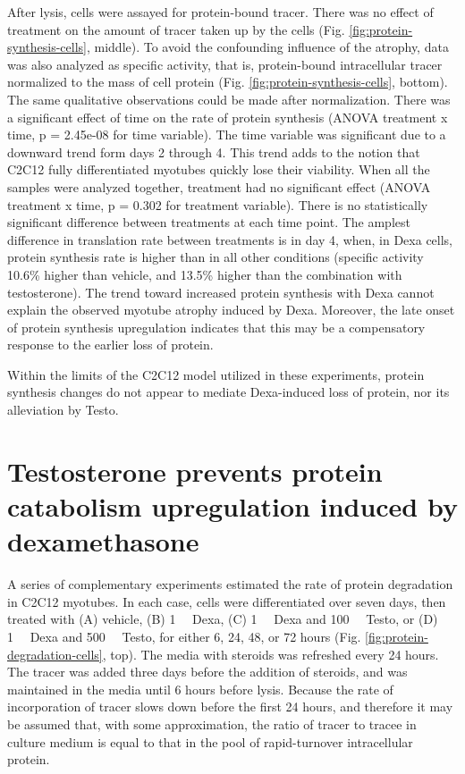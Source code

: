 \documentclass[12pt,english]{report}\usepackage[]{graphicx}\usepackage[]{color}
\begin{document}
After lysis, cells were assayed for protein-bound tracer. There was
no effect of treatment on the amount of tracer taken up by the cells
(Fig. \ref{fig:protein-synthesis-cells}, middle). To avoid the confounding
influence of the atrophy, data was also analyzed as specific activity,
that is, protein-bound intracellular tracer normalized to the mass
of cell protein (Fig. \ref{fig:protein-synthesis-cells}, bottom).
The same qualitative observations could be made after normalization.
There was a significant effect of time on the rate of protein synthesis
(ANOVA treatment x time, p = 2.45e-08
for time variable). The time variable was significant due to a downward
trend form days 2 through 4. This trend adds to the notion that C2C12
fully differentiated myotubes quickly lose their viability. When all
the samples were analyzed together, treatment had no significant effect
(ANOVA treatment x time, p = 0.302
for treatment variable). There is no statistically significant difference
between treatments at each time point. The amplest difference in translation
rate between treatments is in day 4, when, in Dexa cells, protein
synthesis rate is higher than in all other conditions (specific activity
10.6\%
higher than vehicle, and 13.5\%
higher than the combination with testosterone). The trend toward increased
protein synthesis with Dexa cannot explain the observed myotube atrophy
induced by Dexa. Moreover, the late onset of protein synthesis upregulation
indicates that this may be a compensatory response to the earlier
loss of protein.

Within the limits of the C2C12 model utilized in these experiments,
protein synthesis changes do not appear to mediate Dexa-induced loss
of protein, nor its alleviation by Testo.


\section{Testosterone prevents protein catabolism upregulation induced by
dexamethasone}

A series of complementary experiments estimated the rate of protein
degradation in C2C12 myotubes. In each case, cells were differentiated
over seven days, then treated with (A) vehicle, (B) \SI{1}{\micro\molar}
Dexa, (C) \SI{1}{\micro\molar}  Dexa and \SI{100}{\nano\molar} Testo,
or (D) \SI{1}{\micro\molar} Dexa and \SI{500}{\nano\molar} Testo,
for either 6, 24, 48, or 72 hours (Fig. \ref{fig:protein-degradation-cells},
top). The media with steroids was refreshed every 24 hours. The tracer
was added three days before the addition of steroids, and was maintained
in the media until 6 hours before lysis. Because the rate of incorporation
of tracer slows down before the first 24 hours, and therefore it may
be assumed that, with some approximation, the ratio of tracer to tracee
in culture medium is equal to that in the pool of rapid-turnover intracellular
protein.
\end{document}
